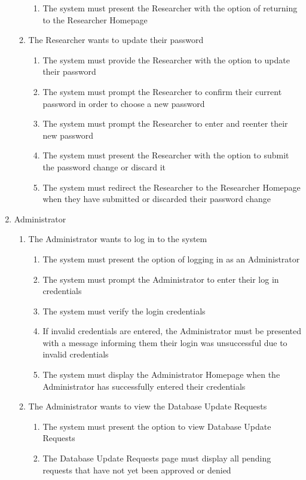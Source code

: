 \documentclass[]{article}
\begin{document}
\begin{enumerate}[{VP}1.]
\begin{enumerate}[{BE2}.1]
\begin{enumerate}
		    \item The system must present the Researcher with the option of returning to the Researcher Homepage
		\end{enumerate}
		\item The Researcher wants to update their password
		\begin{enumerate}
		    \item The system must provide the Researcher with the option to update their password
		    \item The system must prompt the Researcher to confirm their current password in order to choose a new password
		    \item The system must prompt the Researcher to enter and reenter their new password
		    \item The system must present the Researcher with the option to submit the password change or discard it
		    \item The system must redirect the Researcher to the Researcher Homepage when they have submitted or discarded their password change
		\end{enumerate}
	\end{enumerate}
	\item Administrator
	\begin{enumerate}[{BE3}.1]
	    \item The Administrator wants to log in to the system
	    \begin{enumerate}
	        \item The system must present the option of logging in as an Administrator
	        \item The system must prompt the Administrator to enter their log in credentials
			\item The system must verify the login credentials
			\item If invalid credentials are entered, the Administrator must be presented with a message informing them their login was unsuccessful due to invalid credentials
			\item The system must display the Administrator Homepage when the Administrator has successfully entered their credentials
	    \end{enumerate}
	    \item The Administrator wants to view the Database Update Requests
	    \begin{enumerate}
	        \item The system must present the option to view Database Update Requests
	        \item The Database Update Requests page must display all pending requests that have not yet been approved or denied

\end{enumerate}
\end{enumerate}
\end{enumerate}
\end{document}
